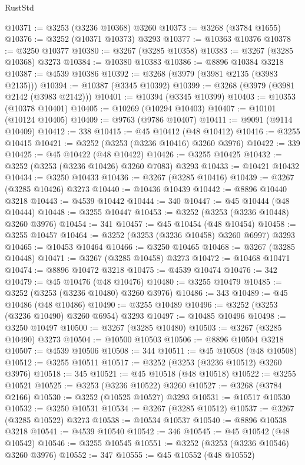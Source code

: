 \begin{lexlean}{RustStd}
\begin{coremodule}
{\begin{coremodule}
{{{{{{{{{{{{{{{{{{{{{{{{{{{{{{{{{{{{{{{@10371 := @3253 (@3236 @10368) @3260
@10373 := @3268 (@3784 @1655)
@10376 := @3252 (@10371 @10373) @3293
@10377 := @10363 @10376
@10378 := @3250 @10377
@10380 := @3267 (@3285 @10358)
@10383 := @3267 (@3285 @10368) @3273
@10384 := @10380 @10383
@10386 := @8896 @10384 @3218
@10387 := @4539 @10386
@10392 := @3268 (@3979 (@3981 @2135 (@3983 @2135)))
@10394 := @10387 (@3345 @10392)
@10399 := @3268 (@3979 (@3981 @2142 (@3983 @2142)))
@10401 := @10394 (@3345 @10399)
@10403 := @10353 (@10378 @10401)
@10405 := @10269 (@10294 @10403)
@10407 := @10101 (@10124 @10405)
@10409 := @9763 (@9786 @10407)
@10411 := @9091 (@9114 @10409)
@10412 := 338
@10415 := @45 @10412 (@48 @10412)
@10416 := @3255 @10415
@10421 := @3252 (@3253 (@3236 @10416) @3260 @3976)
@10422 := 339
@10425 := @45 @10422 (@48 @10422)
@10426 := @3255 @10425
@10432 := @3252 (@3253 (@3236 @10426) @3260 @7083) @3293
@10433 := @10421 @10432
@10434 := @3250 @10433
@10436 := @3267 (@3285 @10416)
@10439 := @3267 (@3285 @10426) @3273
@10440 := @10436 @10439
@10442 := @8896 @10440 @3218
@10443 := @4539 @10442
@10444 := 340
@10447 := @45 @10444 (@48 @10444)
@10448 := @3255 @10447
@10453 := @3252 (@3253 (@3236 @10448) @3260 @3976)
@10454 := 341
@10457 := @45 @10454 (@48 @10454)
@10458 := @3255 @10457
@10464 := @3252 (@3253 (@3236 @10458) @3260 @6997) @3293
@10465 := @10453 @10464
@10466 := @3250 @10465
@10468 := @3267 (@3285 @10448)
@10471 := @3267 (@3285 @10458) @3273
@10472 := @10468 @10471
@10474 := @8896 @10472 @3218
@10475 := @4539 @10474
@10476 := 342
@10479 := @45 @10476 (@48 @10476)
@10480 := @3255 @10479
@10485 := @3252 (@3253 (@3236 @10480) @3260 @3976)
@10486 := 343
@10489 := @45 @10486 (@48 @10486)
@10490 := @3255 @10489
@10496 := @3252 (@3253 (@3236 @10490) @3260 @6954) @3293
@10497 := @10485 @10496
@10498 := @3250 @10497
@10500 := @3267 (@3285 @10480)
@10503 := @3267 (@3285 @10490) @3273
@10504 := @10500 @10503
@10506 := @8896 @10504 @3218
@10507 := @4539 @10506
@10508 := 344
@10511 := @45 @10508 (@48 @10508)
@10512 := @3255 @10511
@10517 := @3252 (@3253 (@3236 @10512) @3260 @3976)
@10518 := 345
@10521 := @45 @10518 (@48 @10518)
@10522 := @3255 @10521
@10525 := @3253 (@3236 @10522) @3260
@10527 := @3268 (@3784 @2166)
@10530 := @3252 (@10525 @10527) @3293
@10531 := @10517 @10530
@10532 := @3250 @10531
@10534 := @3267 (@3285 @10512)
@10537 := @3267 (@3285 @10522) @3273
@10538 := @10534 @10537
@10540 := @8896 @10538 @3218
@10541 := @4539 @10540
@10542 := 346
@10545 := @45 @10542 (@48 @10542)
@10546 := @3255 @10545
@10551 := @3252 (@3253 (@3236 @10546) @3260 @3976)
@10552 := 347
@10555 := @45 @10552 (@48 @10552)
}}}}}}}}}}}}}}}}}}}}}}}}}}}}}}}}}}}}}}}
\end{coremodule}}
\end{coremodule}
\end{lexlean}
